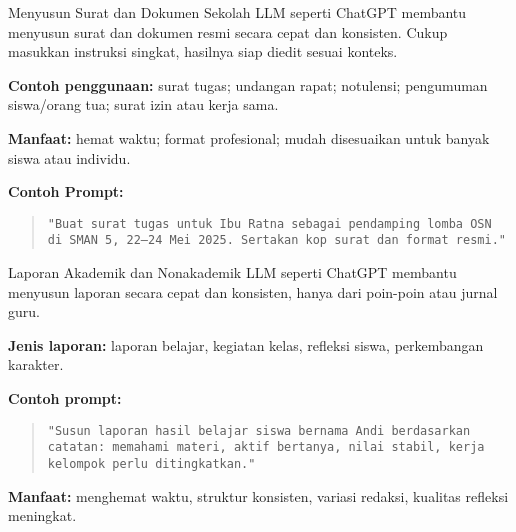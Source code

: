 \documentclass[aspectratio=169, table]{beamer}
\begin{document}
\begin{frame}[fragile]{Menyusun Surat dan Dokumen Sekolah}
	\vspace{20pt}
	LLM seperti ChatGPT membantu menyusun surat dan dokumen resmi secara cepat dan konsisten. Cukup masukkan instruksi singkat, hasilnya siap diedit sesuai konteks.
	
	\vspace{10pt}
	\textbf{Contoh penggunaan:}  
	surat tugas; undangan rapat; notulensi; pengumuman siswa/orang tua; surat izin atau kerja sama.
	
	\vspace{10pt}
	\textbf{Manfaat:}  
	hemat waktu; format profesional; mudah disesuaikan untuk banyak siswa atau individu.
	
	\vspace{10pt}
	\textbf{Contoh Prompt:}
	\begin{quote}
		\centering
		\texttt{"Buat surat tugas untuk Ibu Ratna sebagai pendamping lomba OSN di SMAN 5, 22–24 Mei 2025. Sertakan kop surat dan format resmi."}
	\end{quote}
\end{frame}

\begin{frame}[fragile]{Laporan Akademik dan Nonakademik}
	\vspace{20pt}
	LLM seperti ChatGPT membantu menyusun laporan secara cepat dan konsisten, hanya dari poin-poin atau jurnal guru.
	
	\vspace{10pt}
	\textbf{Jenis laporan:}  
	laporan belajar, kegiatan kelas, refleksi siswa, perkembangan karakter.
	
	\vspace{10pt}
	\textbf{Contoh prompt:}
	\begin{quote}
		\centering
		\texttt{"Susun laporan hasil belajar siswa bernama Andi berdasarkan catatan: memahami materi, aktif bertanya, nilai stabil, kerja kelompok perlu ditingkatkan."}
	\end{quote}
	
	\vspace{10pt}
	\textbf{Manfaat:}  
	menghemat waktu, struktur konsisten, variasi redaksi, kualitas refleksi meningkat.
\end{frame}
\end{document}

